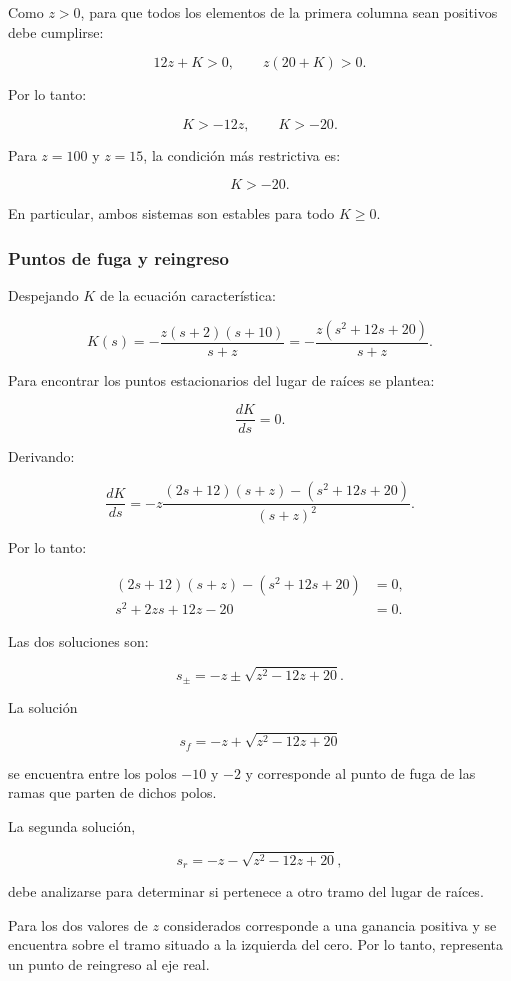 \documentclass[12pt,a4paper]{article}
\begin{document}
Como $z>0$, para que todos los elementos de la primera
columna sean positivos debe cumplirse:

\[
12z+K>0,
\qquad
z(20+K)>0.
\]

Por lo tanto:

\[
K>-12z,
\qquad
K>-20.
\]

Para $z=100$ y $z=15$, la condición más restrictiva es:

\[
\boxed{K>-20.}
\]

En particular, ambos sistemas son estables para todo $K\geq0$.


\subsubsection*{Puntos de fuga y reingreso}

Despejando $K$ de la ecuación característica:

\[
K(s)
=
-\frac{z(s+2)(s+10)}{s+z}
=
-\frac{z(s^2+12s+20)}{s+z}.
\]

Para encontrar los puntos estacionarios del lugar de raíces se plantea:

\[
\frac{dK}{ds}=0.
\]

Derivando:

\[
\frac{dK}{ds}
=
-z
\frac{
(2s+12)(s+z)-(s^2+12s+20)
}{
(s+z)^2
}.
\]

Por lo tanto:

\begin{align*}
(2s+12)(s+z)-(s^2+12s+20)&=0,\\
s^2+2zs+12z-20&=0.
\end{align*}

Las dos soluciones son:

\[
\boxed{
s_{\pm}
=
-z\pm\sqrt{z^2-12z+20}.
}
\]

La solución

\[
s_f
=
-z+\sqrt{z^2-12z+20}
\]

se encuentra entre los polos $-10$ y $-2$ y corresponde
al punto de fuga de las ramas que parten de dichos polos.

La segunda solución,

\[
s_r
=
-z-\sqrt{z^2-12z+20},
\]

debe analizarse para determinar si pertenece a otro tramo
del lugar de raíces.

Para los dos valores de $z$ considerados corresponde a
una ganancia positiva y se encuentra sobre el tramo situado
a la izquierda del cero. Por lo tanto, representa un punto
de reingreso al eje real.
\end{document}
